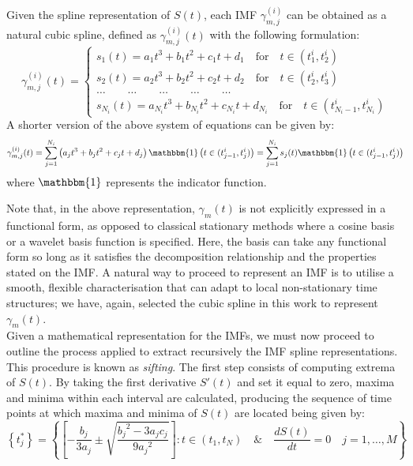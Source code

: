Given the spline representation of $S(t)$, each IMF $\gamma_{m,j}^{(i)}$ can be obtained as a natural cubic spline, defined as $\gamma_{m,j}^{(i)}(t)$ with the following formulation:
\begin{equation*}
\gamma_{m,j}^{(i)}(t) = \begin{cases}
s_1(t) = a_1 t^3 + b_1 t^2 + c_1 t + d_1 \quad \mbox{for} \quad t \in (t_1^i, t_2^i) \\
s_2(t) = a_2 t^3 + b_2 t^2 + c_2 t + d_2 \quad \mbox{for} \quad t \in (t_2^i, t_3^i)\\
\dots \quad \quad \dots \quad \quad \dots \quad \quad \dots \quad \quad \dots\\
s_{N_i}(t) = a_{N_i} t^3 + b_{N_i} t^2 + c_{N_i} t + d_{N_i} \quad \mbox{for} \quad t \in (t_{{N_i}-1}^i, t_{N_i}^i)
\end{cases}
\end{equation*}
A shorter version of the above system of equations can be given by:
\begin{equation}
\gamma_{m,j}^{(i)}(t) = \sum_{j = 1}^{N_i} \left( a_j t^3 + b_j t^2 + c_j t + d_j \right){\mathbbm{1}} \left( t \in (t_{j-1}^i, t_j^i) \right) = \sum_{j = 1}^{N_i} s_j (t) {\mathbbm{1}} \left( t \in (t_{j-1}^i, t_j^i) \right) 
\end{equation}
where $\mathbbm{1}$ represents the indicator function.

\noindent Note that, in the above representation, $\gamma_m(t)$ is not explicitly expressed in a functional form, as opposed to classical stationary methods where a cosine basis or a wavelet basis function is specified. Here, the basis can take any functional form so long as it satisfies the decomposition relationship and the properties stated on the IMF. A natural way to proceed to represent an IMF is to utilise a smooth, flexible characterisation that can adapt to local non-stationary time structures; we have, again, selected the cubic spline in this work to represent  $\gamma_m(t)$.\\
\noindent Given a mathematical representation for the IMFs, we must now proceed to outline the process applied to extract recursively the IMF spline representations. This procedure is known as \textit{sifting}. The first step consists of computing extrema of $S(t)$. By taking the first derivative $S'(t)$ and set it equal to zero, maxima and minima within each interval are calculated, producing the sequence of time points at which maxima and minima of $S(t)$ are located being given by:
\begin{equation}
\label{t_j}
\left\{ t^*_{j} \right\}  = \left\{ \left[ - \frac{b_j}{3 a_j} \pm \sqrt{\frac{{b_j}^2 - 3a_j c_j}{9 {a_j}^2}} \right] : t \in (t_1, t_N) \quad \& \quad \frac{d S(t)}{dt} = 0  \quad j= 1, \dots, M  \right\}
\end{equation}

